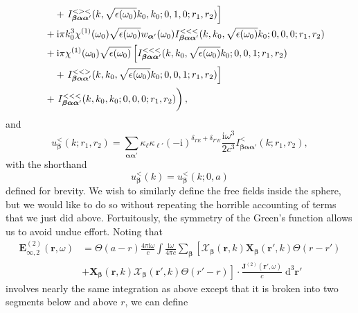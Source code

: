 \documentclass{article}
\begin{document}
\begin{equation}
\begin{split}
&\quad\quad + \left.I_{\bm{\beta}\bm{\alpha}\bm{\alpha}'}^{<><}(k,\sqrt{\epsilon(\omega_0)}k_0,k_0;0,1,0;r_1,r_2)\right]\\
&\quad + \mathrm{i}\pi k_0^3\chi^{(1)}(\omega_0)\sqrt{\epsilon(\omega_0)}w_{\bm{\alpha}'}(\omega_0)I_{\bm{\beta}\bm{\alpha}\bm{\alpha}'}^{<<<}(k,k_0,\sqrt{\epsilon(\omega_0)}k_0;0,0,0;r_1,r_2)\\
&\quad + \mathrm{i}\pi\chi^{(1)}(\omega_0)\sqrt{\epsilon(\omega_0)}\left[I_{\bm{\beta}\bm{\alpha}\bm{\alpha}'}^{<<<}(k,k_0,\sqrt{\epsilon(\omega_0)}k_0;0,0,1;r_1,r_2)\right.\\
&\quad\quad + \left.I_{\bm{\beta}\bm{\alpha}\bm{\alpha}'}^{<<>}(k,k_0,\sqrt{\epsilon(\omega_0)}k_0;0,0,1;r_1,r_2)\right]\\
&\quad + \left.I_{\bm{\beta}\bm{\alpha}\bm{\alpha}'}^{<<<}(k,k_0,k_0;0,0,0;r_1,r_2) \vphantom{\left[\chi^{(1)}(\omega_0)\right]^2} \right),
\end{split}
\end{equation}
and
\begin{equation}
u_{\bm{\beta}}^<(k;r_1,r_2) = \sum_{\bm{\alpha}\bm{\alpha}'}\kappa_{\ell}\kappa_{\ell'}(-\mathrm{i})^{\delta_{TE} + \delta_{T'E}}\frac{\mathrm{i}\omega^3}{2 c^3}I_{\bm{\beta}\bm{\alpha}\bm{\alpha}'}^<(k;r_1,r_2),
\end{equation}
with the shorthand
\begin{equation}
u_{\bm{\beta}}^<(k) = u_{\bm{\beta}}^<(k;0,a)
\end{equation}
defined for brevity. We wish to similarly define the free fields inside the sphere, but we would like to do so without repeating the horrible accounting of terms that we just did above. Fortuitously, the symmetry of the Green's function allows us to avoid undue effort. Noting that
\begin{equation}
\begin{split}
\mathbf{E}_{\infty,2}^{(2)}(\mathbf{r},\omega) &= \Theta(a - r)\frac{4\pi\mathrm{i}\omega}{c}\int\frac{\mathrm{i}\omega}{4\pi c}\sum_{\bm{\beta}}\left[\bm{\mathcal{X}}_{\bm{\beta}}(\mathbf{r},k)\mathbf{X}_{\bm{\beta}}(\mathbf{r}',k)\Theta(r - r')\right.\\
& + \left.\mathbf{X}_{\bm{\beta}}(\mathbf{r},k)\bm{\mathcal{X}}_{\bm{\beta}}(\mathbf{r}',k)\Theta(r' - r)\right]\cdot\frac{\mathbf{J}^{(2)}(\mathbf{r}',\omega)}{c}\;\mathrm{d}^3\mathbf{r}'
\end{split}
\end{equation}
involves nearly the same integration as above except that it is broken into two segments below and above $r$, we can define
\end{document}
